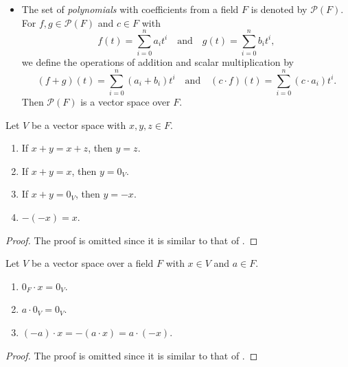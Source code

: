 \begin{examples}
\begin{itemize}
    \item The set of \emph{polynomials} with coefficients from a field $F$ is
      denoted by $\mathcal{P}(F)$.
      For $f, g \in \mathcal{P}(F)$ and $c \in F$ with
      \begin{equation*}
        f(t) = \sum_{i=0}^n a_it^i
        \quad \text{and} \quad
        g(t) = \sum_{i=0}^n b_it^i,
      \end{equation*}
      we define the operations of addition and scalar multiplication by
      \begin{equation*}
        (f + g)(t) = \sum_{i=0}^n (a_i + b_i)t^i
        \quad \text{and} \quad
        (c \cdot f)(t) = \sum_{i=0}^n (c \cdot a_i)t^i.
      \end{equation*}
      Then $\mathcal{P}(F)$ is a vector space over $F$.
  \end{itemize}
\end{examples}

\begin{proposition}\label{prop:vector-space-addition}
  Let $V$ be a vector space with $x, y, z \in F$.
  \begin{enumerate}
    \item If $x + y = x + z$, then $y = z$.
    \item If $x + y = x$, then $y = 0_V$.
    \item If $x + y = 0_V$, then $y = -x$.
    \item $-(-x) = x$.
  \end{enumerate}
\end{proposition}
\begin{proof}
  The proof is omitted since it is similar to that of
  .
\end{proof}

\begin{proposition}\label{prop:vector-space-operation}
  Let $V$ be a vector space over a field $F$ with $x \in V$ and $a \in F$.
  \begin{enumerate}
    \item $0_F \cdot x = 0_V$.
    \item $a \cdot 0_V = 0_V$.
    \item $(-a) \cdot x = -(a \cdot x) = a \cdot (-x)$.
  \end{enumerate}
\end{proposition}
\begin{proof}
  The proof is omitted since it is similar to that of
  .
\end{proof}

